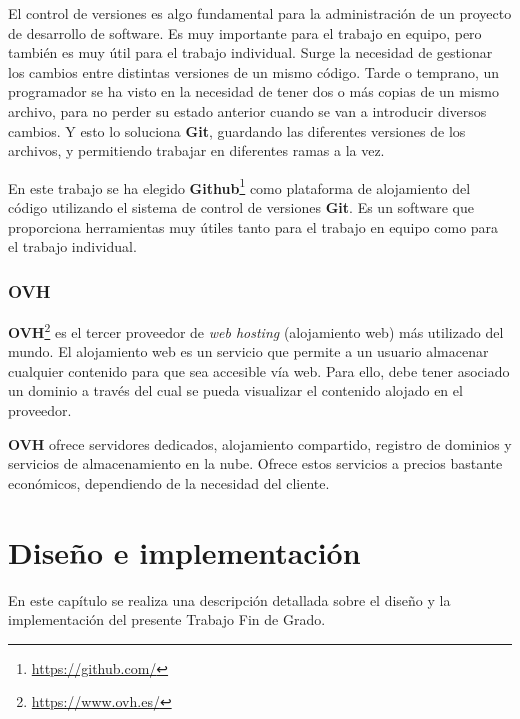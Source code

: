 \documentclass[a4paper, 12pt]{book}
\begin{document}
El control de versiones es algo fundamental para la administración de un proyecto de desarrollo de software. Es muy importante para el trabajo en equipo, pero también es muy útil para el trabajo individual. Surge la necesidad de gestionar los cambios entre distintas versiones de un mismo código. Tarde o temprano, un programador se ha visto en la necesidad de tener dos o más copias de un mismo archivo, para no perder su estado anterior cuando se van a introducir diversos cambios. Y esto lo soluciona \textbf{Git}, guardando las diferentes versiones de los archivos, y permitiendo trabajar en diferentes ramas a la vez.
\newline

En este trabajo se ha elegido \textbf{Github}\footnote{\url{https://github.com/}} como plataforma de alojamiento del código utilizando el sistema de control de versiones \textbf{Git}. Es un software que proporciona herramientas muy útiles tanto para el trabajo en equipo como para el trabajo individual.

\subsection{OVH} 
\label{subsec:ovh}

\textbf{OVH}\footnote{\url{https://www.ovh.es/}} es el tercer proveedor de \textit{web hosting} (alojamiento web) más utilizado del mundo. El alojamiento web es un servicio que permite a un usuario almacenar cualquier contenido para que sea accesible vía web. Para ello, debe tener asociado un dominio a través del cual se pueda visualizar el contenido alojado en el proveedor.
\newline

\textbf{OVH} ofrece servidores dedicados, alojamiento compartido, registro de dominios y servicios de almacenamiento en la nube. Ofrece estos servicios a precios bastante económicos, dependiendo de la necesidad del cliente.



\cleardoublepage
\chapter{Diseño e implementación}

En este capítulo se realiza una descripción detallada sobre el diseño y la implementación del presente Trabajo Fin de Grado.
\newline
\end{document}
